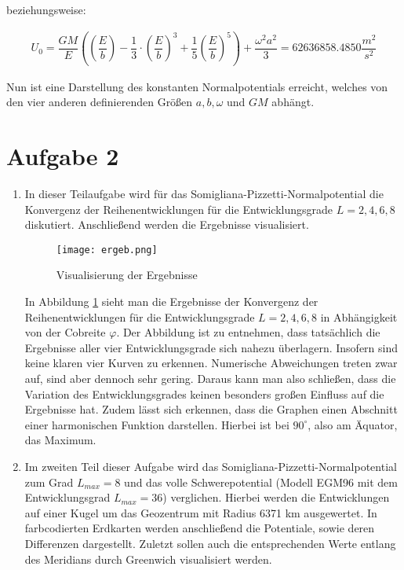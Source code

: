 beziehungsweise: 

\begin{align*}
U_0 = \dfrac{GM}{E} \left(\left(\dfrac{E}{b}\right) - \dfrac{1}{3} \cdot \left(\dfrac{E}{b}\right)^3 + \dfrac{1}{5} \left(\dfrac{E}{b}\right)^5\right) + \dfrac{\omega^2 a^2}{3} = 62636858.4850 \dfrac{m^2}{s^2}
\end{align*}

Nun ist eine Darstellung des konstanten Normalpotentials erreicht, welches von den vier anderen definierenden Größen $a,b,\omega$ und $GM$ abhängt. 


\section*{Aufgabe 2}

\begin{enumerate}
\item In dieser Teilaufgabe wird für das Somigliana-Pizzetti-Normalpotential die Konvergenz der Reihenentwicklungen für die Entwicklungsgrade $L=2,4,6,8$ diskutiert. Anschließend werden die Ergebnisse visualisiert.

\begin{figure}[H]
\centering
\texttt{[image: ergeb.png]}
\caption{Visualisierung der Ergebnisse}
\label{ergeb}
\end{figure}

In Abbildung \ref{ergeb} sieht man die Ergebnisse der Konvergenz der Reihenentwicklungen für die Entwicklungsgrade $L=2,4,6,8$ in Abhängigkeit von der Cobreite $\varphi$. Der Abbildung ist zu entnehmen, dass tatsächlich die Ergebnisse aller vier Entwicklungsgrade sich nahezu überlagern. Insofern sind keine klaren vier Kurven zu erkennen. Numerische Abweichungen treten zwar auf, sind aber dennoch sehr gering. Daraus kann man also schließen, dass die Variation des Entwicklungsgrades keinen besonders großen Einfluss auf die Ergebnisse hat. Zudem lässt sich erkennen, dass die Graphen einen Abschnitt einer harmonischen Funktion darstellen. Hierbei ist bei $90^{\circ}$, also am Äquator, das Maximum.   

\item Im zweiten Teil dieser Aufgabe wird das Somigliana-Pizzetti-Normalpotential zum Grad $L_{max}=8$ und das volle Schwerepotential (Modell EGM96 mit dem Entwicklungsgrad $L_{max} = 36$) verglichen. Hierbei werden die Entwicklungen auf einer Kugel um das Geozentrum mit Radius 6371 km ausgewertet. In farbcodierten Erdkarten werden anschließend die Potentiale, sowie deren Differenzen dargestellt. Zuletzt sollen auch die entsprechenden Werte entlang des Meridians durch Greenwich visualisiert werden. 


\end{enumerate}
